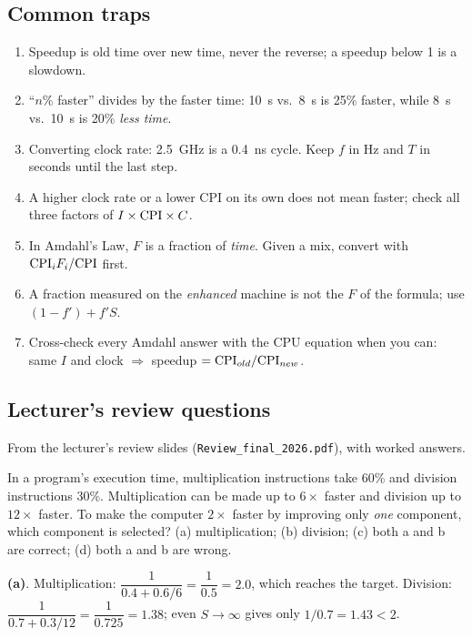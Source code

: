 \subsection{Common traps}
\begin{enumerate}[leftmargin=*]
  \item Speedup is old time over new time, never the reverse; a speedup below 1
  is a slowdown.
  \item ``$n\%$ faster'' divides by the faster time: 10~s vs.\ 8~s is 25\%
  faster, while 8~s vs.\ 10~s is 20\% \emph{less time}.
  \item Converting clock rate: 2.5~GHz is a 0.4~ns cycle. Keep $f$ in Hz and
  $T$ in seconds until the last step.
  \item A higher clock rate or a lower CPI on its own does not mean faster; check
  all three factors of $I\times\mathrm{CPI}\times C$.
  \item In Amdahl's Law, $F$ is a fraction of \emph{time}. Given a mix, convert
  with $\mathrm{CPI}_iF_i/\mathrm{CPI}$ first.
  \item A fraction measured on the \emph{enhanced} machine is not the $F$ of the
  formula; use $(1-f')+f'S$.
  \item Cross-check every Amdahl answer with the CPU equation when you can:
  same $I$ and clock $\Rightarrow$ speedup $=\mathrm{CPI}_{old}/\mathrm{CPI}_{new}$.
\end{enumerate}

\subsection{Lecturer's review questions}
From the lecturer's review slides (\texttt{Review\_final\_2026.pdf}), with worked answers.

\begin{exercise}[Lecturer 1]\label{l:perf1}
In a program's execution time, multiplication instructions take 60\% and division
instructions 30\%. Multiplication can be made up to $6\times$ faster and division up
to $12\times$ faster. To make the computer $2\times$ faster by improving only
\emph{one} component, which component is selected?
(a) multiplication; (b) division; (c) both a and b are correct; (d) both a and b are
wrong.
\end{exercise}
\begin{solution}
\textbf{(a)}. Multiplication: $\dfrac{1}{0.4+0.6/6}=\dfrac{1}{0.5}=2.0$, which
reaches the target. Division: $\dfrac{1}{0.7+0.3/12}=\dfrac{1}{0.725}=1.38$; even
$S\to\infty$ gives only $1/0.7=1.43<2$.
\end{solution}

